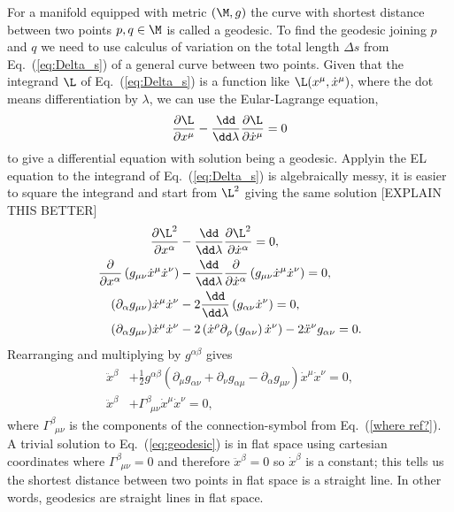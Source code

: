 For a manifold equipped with metric $(\M,g)$ the curve with shortest distance between two points $p,q\in\M$ is called a geodesic. To find the geodesic joining $p$ and $q$ we need to use calculus of variation on the total length $\Delta s$ from Eq.~(\ref{eq:Delta_s}) of a general curve between two points. Given that the integrand $\L$ of Eq.~(\ref{eq:Delta_s}) is a function like $\L(x^\mu,\dot{x}^\mu)$, where the dot means differentiation by $\lambda$, we can use the Eular-Lagrange equation,
\begin{align}
\frac{\partial{\L}}{\partial x^\mu} - \frac{\dd}{\dd \lambda}\frac{\partial \L}{\partial \dot{x}^\mu} = 0
\end{align}
to give a differential equation with solution being a geodesic. Applyin the EL equation to the integrand of Eq.~(\ref{eq:Delta_s}) is algebraically messy, it is easier to square the integrand and start from $\L^2$ giving the same solution [EXPLAIN THIS BETTER]
\begin{align}
\frac{\partial{\L^2}}{\partial x^\alpha} &- \frac{\dd}{\dd \lambda}\frac{\partial \L^2}{\partial \dot{x}^\alpha} = 0, \\
\frac{\partial}{\partial x^\alpha} \left(g_{\mu\nu}\dot{x}^\mu\dot{x}^\nu\right) &- \frac{\dd}{\dd \lambda}\frac{\partial }{\partial \dot{x}^\alpha}\left(g_{\mu\nu}\dot{x}^\mu\dot{x}^\nu\right) = 0, \\
(\partial_\alpha g_{\mu\nu})\dot{x}^\mu\dot{x}^\nu &- 2\frac{\dd}{\dd \lambda}\left(g_{\alpha\nu}\dot{x}^\nu\right) = 0, \\
(\partial_\alpha g_{\mu\nu})\dot{x}^\mu\dot{x}^\nu &- 2\left(\dot{x}^\rho \partial_\rho \left(g_{\alpha\nu}\right)\dot{x}^\nu\right) - 2\ddot{x}^\nu g_{\alpha\nu} =0. 
\end{align}
Rearranging and multiplying by $g^{\alpha\beta}$ gives
\begin{align}
\ddot{x}^\beta &+ \frac{1}{2}g^{\alpha\beta}\left(\partial_{\mu}g_{\alpha\nu} +\partial_{\nu}g_{\alpha\mu} -\partial_{\alpha}g_{\mu\nu} \right)\dot{x}^\mu\dot{x}^\nu=0,\\
 \label{eq:geodesic}\ddot{x}^\beta &+ \Gamma^\beta_{\,\,\,\mu\nu}\dot{x}^\mu\dot{x}^\nu=0,
\end{align}
where $\Gamma^\beta_{\,\,\,\mu\nu}$ is the components of the connection-symbol from Eq.~(\ref{where ref?}). A trivial solution to Eq.~(\ref{eq:geodesic}) is in flat space using cartesian coordinates where $\Gamma^\beta_{\,\,\,\mu\nu}=0$ and therefore $\ddot{x}^\beta=0$ so $\dot{x}^\beta$ is a constant; this tells us the shortest distance between two points in flat space is a straight line. In other words, geodesics are straight lines in flat space.






